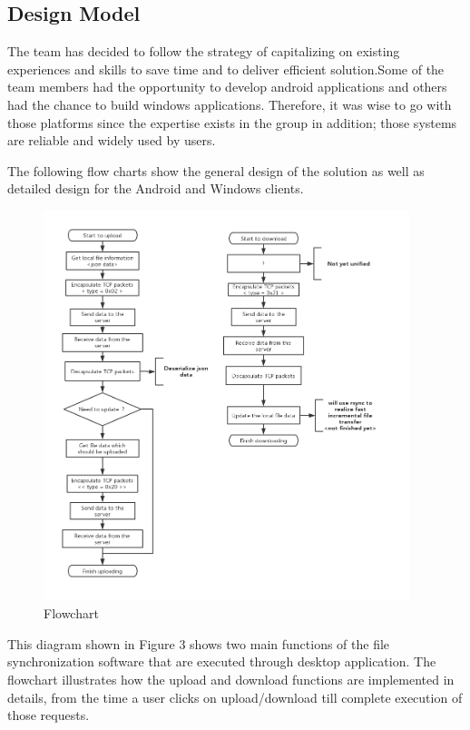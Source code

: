 \documentclass{article}
\begin{document}
\subsection{Design Model}
The team has decided to follow the strategy of capitalizing on existing experiences and skills to save time and to deliver efficient solution.Some of the team members had the opportunity to develop android applications and others had the chance to build windows applications. Therefore, it was wise to go with those platforms since the expertise exists in the group in addition; those systems are reliable and widely used by users.

The following flow charts show the general design of the solution as well as detailed design for the Android and Windows clients.

\begin{figure}[h]
    \centering
    \includegraphics[width=0.95\textwidth]{flowchart}
    \caption{Flowchart}
    \label{fig:flowchart1}
\end{figure}


This diagram shown in Figure 3 shows two main functions of the file synchronization software that are executed through desktop application.
The flowchart illustrates how the upload and download functions are implemented in details, from the time a user clicks on upload/download till complete execution of those requests.
\end{document}
